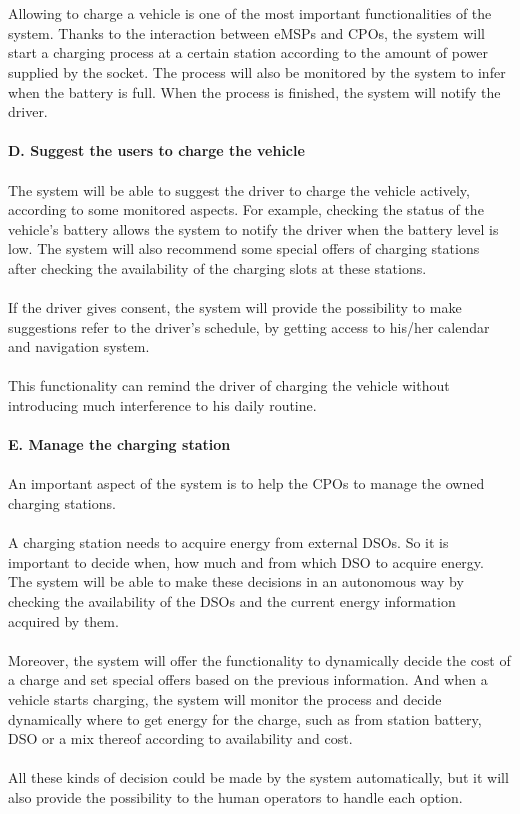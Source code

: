 \documentclass[../main.tex]{subfiles}
\begin{document}
\\
\\
Allowing to charge a vehicle is one of the most important functionalities of the system. Thanks to the interaction between eMSPs and CPOs, the system will start a charging process at a certain station according to the amount of power supplied by the socket. The process will also be monitored by the system to infer when the battery is full. When the process is finished, the system will notify the driver.
\vspace{1.5em}
\\
\\
\textbf{D. Suggest the users to charge the vehicle}
\vspace{-0.7em}
\\
\\
The system will be able to suggest the driver to charge the vehicle actively, according to some monitored aspects. For example, checking the status of the vehicle’s battery allows the system to notify the driver when the battery level is low. The system will also recommend some special offers of charging stations after checking the availability of the charging slots at these stations.
\\
\\
If the driver gives consent, the system will provide the possibility to make suggestions refer to the driver’s schedule, by getting access to his/her calendar and navigation system.
\\
\\
This functionality can remind the driver of charging the vehicle without introducing much interference to his daily routine.
\vspace{1.5em}
\\
\\
\textbf{E. Manage the charging station}
\vspace{-0.7em}
\\
\\
An important aspect of the system is to help the CPOs to manage the owned charging stations.
\\
\\
A charging station needs to acquire energy from external DSOs. So it is important to decide when, how much and from which DSO to acquire energy. The system will be able to make these decisions in an autonomous way by checking the availability of the DSOs and the current energy information acquired by them.
\\
\\
Moreover, the system will offer the functionality to dynamically decide the cost of a charge and set special offers based on the previous information. And when a vehicle starts charging, the system will monitor the process and decide dynamically where to get energy for the charge, such as from station battery, DSO or a mix thereof according to availability and cost. 
\\
\\
All these kinds of decision could be made by the system automatically, but it will also provide the possibility to the human operators to handle each option.
\end{document}
